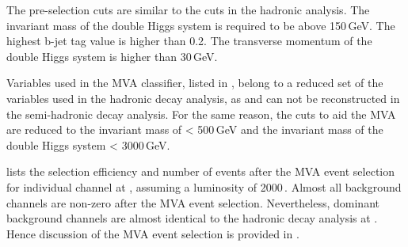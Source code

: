 The pre-selection cuts are similar to the cuts in the hadronic analysis. The invariant mass of the double Higgs system is required to be above 150\,GeV. The highest b-jet tag value is higher than 0.2. The transverse momentum of the double Higgs system is higher than 30\,GeV.

Variables used in the MVA classifier, listed in  ,  belong to  a reduced set of the variables  used in the hadronic decay analysis, as \Hbb and \PW can not be reconstructed in the semi-hadronic decay analysis. For the same reason, the cuts to aid the MVA are reduced to the invariant mass of \Hbb < 500\,GeV and the invariant mass of the double Higgs system < 3000\,GeV.



 lists the  selection efficiency and number of events after the MVA event selection for individual channel at , assuming a luminosity of 2000\,.  Almost all background channels are non-zero after the MVA event selection. Nevertheless,  dominant background channels are almost identical to the hadronic decay analysis  at . Hence discussion of the MVA event selection is provided in .


